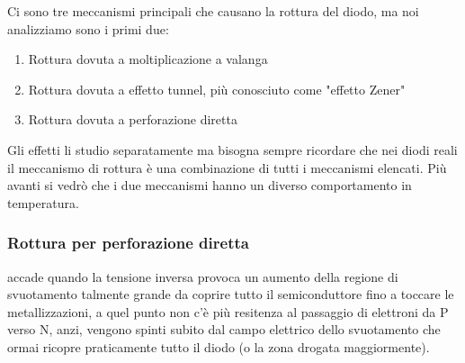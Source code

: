 \begin{center}
\end{center} 

Ci sono tre meccanismi principali che causano la rottura del diodo, ma noi analizziamo sono i primi due:
\begin{enumerate}
    \item Rottura dovuta a moltiplicazione a valanga

    \item Rottura dovuta a effetto tunnel, più conosciuto come "effetto Zener"

    \item Rottura dovuta a perforazione diretta
\end{enumerate}
Gli effetti li studio separatamente ma bisogna sempre ricordare che nei diodi reali il meccanismo di rottura è una combinazione di tutti i meccanismi elencati.
Più avanti si vedrò che i due meccanismi hanno un diverso comportamento in temperatura.

\cleardoublepage%

\subsubsection{Rottura per perforazione diretta}
accade quando la tensione inversa provoca un aumento della regione di svuotamento talmente grande da coprire tutto il semiconduttore fino a toccare le metallizzazioni, a quel punto non c'è più resitenza al passaggio di elettroni da P verso N, anzi, vengono spinti subito dal campo elettrico dello svuotamento che ormai ricopre praticamente tutto il diodo (o la zona drogata maggiormente).

